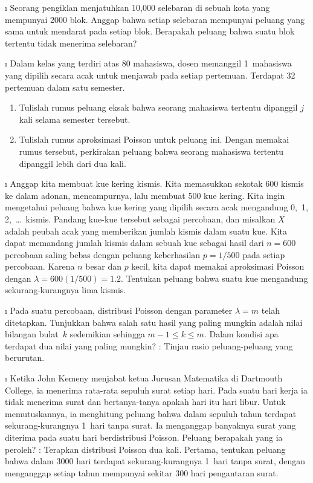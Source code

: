\begin{LJSItem}
\i\label{exer 5.1.115} Seorang pengiklan menjatuhkan 10{,}000 selebaran di sebuah
kota yang mempunyai 2000 blok. Anggap bahwa setiap selebaran mempunyai peluang yang
sama untuk mendarat pada setiap blok. Berapakah peluang bahwa suatu blok tertentu
tidak menerima selebaran?

\i\label{exer 5.1.116} Dalam kelas yang terdiri atas 80 mahasiswa, dosen memanggil
1~mahasiswa yang dipilih secara acak untuk menjawab pada setiap pertemuan. Terdapat
32 pertemuan dalam satu semester.
\begin{enumerate}
\item Tulislah rumus peluang eksak bahwa seorang mahasiswa tertentu dipanggil
$j$ kali selama semester tersebut.

\item Tulislah rumus aproksimasi Poisson untuk peluang ini. Dengan memakai rumus
tersebut, perkirakan peluang bahwa seorang mahasiswa tertentu dipanggil lebih dari dua kali.
\end{enumerate}

\i\label{exer 5.1.29} Anggap kita membuat kue kering kismis. Kita memasukkan sekotak
600 kismis ke dalam adonan, mencampurnya, lalu membuat 500 kue kering. Kita ingin
mengetahui peluang bahwa kue kering yang dipilih secara acak mengandung
0,~1, 2,~\dots\ kismis. Pandang kue-kue tersebut sebagai percobaan, dan misalkan $X$
adalah peubah acak yang memberikan jumlah kismis dalam suatu kue. Kita dapat
memandang jumlah kismis dalam sebuah kue sebagai hasil dari $n = 600$ percobaan saling
bebas dengan peluang keberhasilan $p = 1/500$ pada setiap percobaan. Karena $n$ besar
dan $p$ kecil, kita dapat memakai aproksimasi Poisson dengan
$\lambda = 600(1/500) = 1.2$. Tentukan peluang bahwa suatu kue mengandung
sekurang-kurangnya lima kismis.  

\i\label{exer 5.1.117} Pada suatu percobaan, distribusi Poisson dengan parameter
$\lambda = m$ telah ditetapkan. Tunjukkan bahwa salah satu hasil yang paling mungkin
adalah nilai bilangan bulat~$k$ sedemikian sehingga $m - 1 \leq k \leq m$. Dalam
kondisi apa terdapat dua nilai yang paling mungkin? : Tinjau rasio
peluang-peluang yang berurutan.

\i\label{exer 5.1.118} Ketika John Kemeny menjabat ketua Jurusan
Matematika di Dartmouth College, ia menerima rata-rata sepuluh surat setiap hari.
Pada suatu hari kerja ia tidak menerima surat dan bertanya-tanya apakah hari itu hari
libur. Untuk memutuskannya, ia menghitung peluang bahwa dalam sepuluh tahun terdapat
sekurang-kurangnya 1~hari tanpa surat. Ia menganggap banyaknya surat yang diterima
pada suatu hari berdistribusi Poisson. Peluang berapakah yang ia peroleh?
: Terapkan distribusi Poisson dua kali. Pertama, tentukan peluang bahwa
dalam 3000 hari terdapat sekurang-kurangnya 1~hari tanpa surat, dengan menganggap
setiap tahun mempunyai sekitar 300 hari pengantaran surat.
 

\end{LJSItem}
